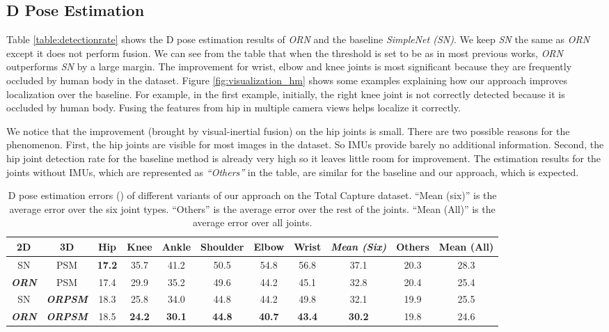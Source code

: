 \documentclass[10pt,twocolumn,letterpaper]{article}
\begin{document}
\subsection{D Pose Estimation}
Table \ref{table:detectionrate} shows the D pose estimation results of \emph{ORN} and the baseline \emph{SimpleNet (SN)}. We keep \emph{SN} the same as \emph{ORN} except it does not perform fusion. We can see from the table that when the threshold  is set to be  as in most previous works, \emph{ORN} outperforms \emph{SN} by a large margin. The improvement for wrist, elbow and knee joints is most significant because they are frequently occluded by human body in the dataset. Figure \ref{fig:visualization_hm} shows some examples explaining how our approach improves localization  over the baseline. For example, in the first example, initially, the right knee joint is not correctly detected because it is occluded by human body. Fusing the features from hip in multiple camera views helps localize it correctly. 

We notice that the improvement (brought by visual-inertial fusion) on the hip joints is small. There are two possible reasons for the phenomenon. First, the hip joints are visible for most images in the dataset. So IMUs provide barely no additional information. Second, the hip joint detection rate for the baseline method is already very high so it leaves little room for improvement. The estimation results for the joints without IMUs, which are represented as \emph{``Others''} in the table, are similar for the baseline and our approach, which is expected.


\begin{table*}[]
\center
\caption{D pose estimation errors () of different variants of our approach on the Total Capture dataset. ``Mean (six)'' is the average error over the six joint types. ``Others'' is the average error over the rest of the joints. ``Mean (All)'' is the average error over all joints.}
\label{table:ablation}
\begin{tabular}{cc||ccccccc||c||c}
\toprule
2D & 3D  & Hip  & Knee & Ankle & Shoulder & Elbow & Wrist & \emph{Mean (Six)} & Others & Mean (All) \\ \hline
SN      & PSM             & \textbf{17.2} & 35.7 & 41.2 & 50.5 & 54.8 & 56.8 & 37.1 & 20.3 & 28.3\\
\textbf{\emph{ORN}}  & PSM             & 17.4 & 29.9 & 35.2 & 49.6 & 44.2 & 45.1 & 32.8 & 20.4 & 25.4 \\
SN      & \textbf{\emph{ORPSM}}        & 18.3 & 25.8 & 34.0 & 44.8 & 44.2 & 49.8 & 32.1 & 19.9 & 25.5\\
\textbf{\emph{ORN}}  & \textbf{\emph{ORPSM}}        & 18.5 & \textbf{24.2} & \textbf{30.1} & \textbf{44.8} & \textbf{40.7} & \textbf{43.4} & \textbf{30.2} & {19.8} & {24.6} \\
\toprule
\end{tabular}
\end{table*}
\end{document}
